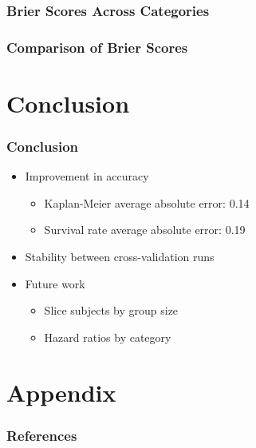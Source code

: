 \documentclass[serif,final,bigger]{beamer}
\begin{document}
  \begin{frame}
    \frametitle{Brier Scores Across Categories}
    \begin{center}
      
    \end{center}
  \end{frame}

  \begin{frame}
    \frametitle{Comparison of Brier Scores}
    \begin{center}
      
    \end{center}
  \end{frame}

  \section{Conclusion}

  \begin{frame}
    \frametitle{Conclusion}
    \begin{itemize}
      \item
        Improvement in accuracy
        \begin{itemize}
          \item
            Kaplan-Meier average absolute error: 0.14
          \item
            Survival rate average absolute error: 0.19
        \end{itemize}
      \item
        Stability between cross-validation runs
      \item Future work
      \begin{itemize}
        \item
          Slice subjects by group size
        \item
          Hazard ratios by category
      \end{itemize}
    \end{itemize}
  \end{frame}

  \section{Appendix}

  \begin{frame}
    \frametitle{References}
    \ssmall
    \linespread{1}
    
    
  \end{frame}
\end{document}
